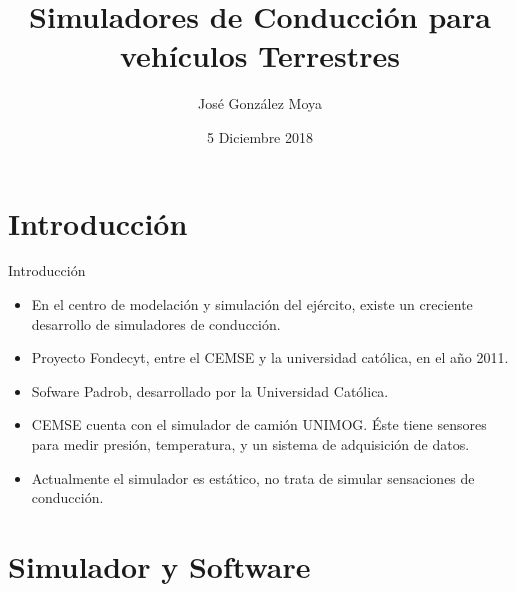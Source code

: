 \documentclass{beamer}
\title[Simuladores de Conducción]{Simuladores de Conducción para vehículos Terrestres}
\author{José González Moya}
\institute{Universidad Andrés Bello}
\date{5 Diciembre 2018}
\begin{document}
\begin{frame}
  \titlepage
\end{frame}


\section{Introducción}

\begin{frame}{Introducción}

\begin{itemize}
  \item En el centro de modelación y simulación del ejército, existe un creciente desarrollo de simuladores de conducción.
  \item Proyecto Fondecyt, entre el CEMSE y la universidad católica, en el año 2011.
  \item Sofware Padrob, desarrollado por la Universidad Católica.
  \item CEMSE cuenta con el simulador de camión UNIMOG. Éste tiene sensores para medir presión, temperatura, y un sistema de adquisición de datos.
  \item Actualmente el simulador es estático, no trata de simular sensaciones de conducción.
\end{itemize}

\vskip 1cm

\end{frame}

\section{Simulador y Software}
\end{document}
